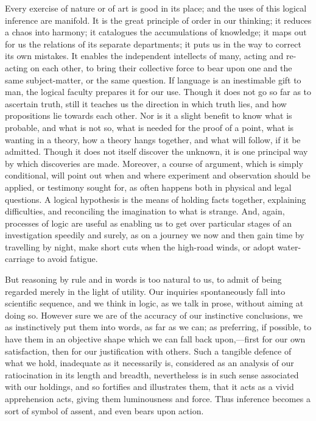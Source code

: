 Every exercise of nature or of art is good in its place; and the
uses of this logical inference are manifold. It is the great principle
of order in our thinking; it reduces a chaos into harmony; it
catalogues the accumulations of knowledge; it maps out for us the
relations of its separate departments; it puts us in the way to
correct its own mistakes. It enables the independent intellects of
many, acting and re-acting on each other, to bring their collective
force to bear upon one and the same subject-matter, or the same
question. If language is an inestimable gift to man, the logical
faculty prepares it for our use. Though it does not go so far as to
ascertain truth, still it teaches us the direction in which truth
lies, and how propositions lie towards each other. Nor is it a
slight benefit to know what is probable, and what is not so, what is
needed for the proof of a point, what is wanting in a theory, how a
theory hangs together, and what will follow, if it be admitted. Though
it does not itself discover the unknown, it is one principal way by
which discoveries are made. Moreover, a course of argument, which is
simply conditional, will point out when and where experiment and
observation should be applied, or testimony sought for, as often
happens both in physical and legal questions. A logical hypothesis is
the means of holding facts together, explaining difficulties, and
reconciling the imagination to what is strange. And, again, processes
of logic are useful as enabling us to get over particular stages of an
investigation speedily and surely, as on a journey we now and then
gain time by travelling by night, make short cuts when the high-road
winds, or adopt water-carriage to avoid fatigue.

But reasoning by rule and in words is too natural to us, to admit
of being regarded merely in the light of utility. Our inquiries
spontaneously fall into scientific sequence, and we think in logic, as
we talk in prose, without aiming at doing so. However sure we are of
the accuracy of our instinctive conclusions, we as instinctively put
them into words, as far as we can; as preferring, if possible, to have
them in an objective shape which we can fall back upon,—first for
our own satisfaction, then for our justification with others. Such a
tangible defence of what we hold, inadequate as it necessarily is,
considered as an analysis of our ratiocination in its length and
breadth, nevertheless is in such sense associated with our holdings,
and so fortifies and illustrates them, that it acts as a vivid
apprehension acts, giving them luminousness and force. Thus inference
becomes a sort of symbol of assent, and even bears upon action.

